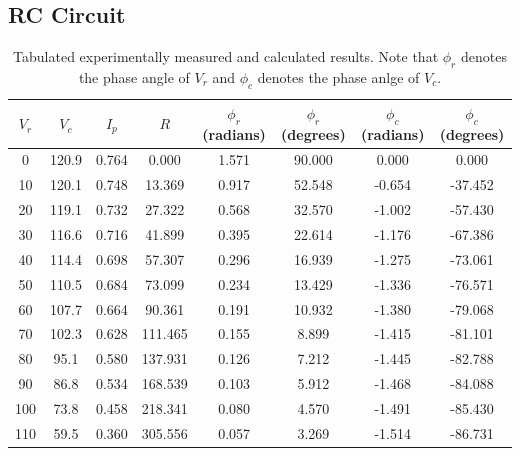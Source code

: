 \documentclass{article}
\begin{document}
  \subsection{RC Circuit}
    \begin{table}[h]
      \centering
      \caption{Tabulated experimentally measured and calculated results. Note that $\phi_r$ denotes the phase angle of $V_r$ and $\phi_c$ denotes the phase anlge of $V_c$. \\}
      {\renewcommand{\arraystretch}{1.2}
      \begin{tabular}{|c|c|c|c|c|c|c|c|}
        \toprule
        \hline
        $V_r$ &  ${V_c}$ &  $I_p$ & $R$ &  $\phi_r$ (radians) &  $\phi_r$ (degrees) & $\phi_c$ (radians) &  $\phi_c$ (degrees) \\
        \hline
        \midrule
        \hline 0 &    120.9 &    0.764 &    0.000 &               1.571 &              90.000 &               0.000 &               0.000  \\
        \hline 10 &    120.1 &    0.748 &   13.369 &               0.917 &              52.548 &              -0.654 &             -37.452 \\
        \hline 20 &    119.1 &    0.732 &   27.322 &               0.568 &              32.570 &              -1.002 &             -57.430 \\
        \hline 30 &    116.6 &    0.716 &   41.899 &               0.395 &              22.614 &              -1.176 &             -67.386 \\
        \hline 40 &    114.4 &    0.698 &   57.307 &               0.296 &              16.939 &              -1.275 &             -73.061 \\
        \hline 50 &    110.5 &    0.684 &   73.099 &               0.234 &              13.429 &              -1.336 &             -76.571 \\
        \hline 60 &    107.7 &    0.664 &   90.361 &               0.191 &              10.932 &              -1.380 &             -79.068 \\
        \hline 70 &    102.3 &    0.628 &  111.465 &               0.155 &               8.899 &              -1.415 &             -81.101 \\
        \hline 80 &     95.1 &    0.580 &  137.931 &               0.126 &               7.212 &              -1.445 &             -82.788 \\
        \hline 90 &     86.8 &    0.534 &  168.539 &               0.103 &               5.912 &              -1.468 &             -84.088 \\
        \hline 100 &     73.8 &    0.458 &  218.341 &               0.080 &               4.570 &              -1.491 &            -85.430 \\
        \hline 110 &     59.5 &    0.360 &  305.556 &               0.057 &               3.269 &              -1.514 &            -86.731 \\
        \hline
        \bottomrule
        \end{tabular}
        }
    \end{table}
\end{document}
